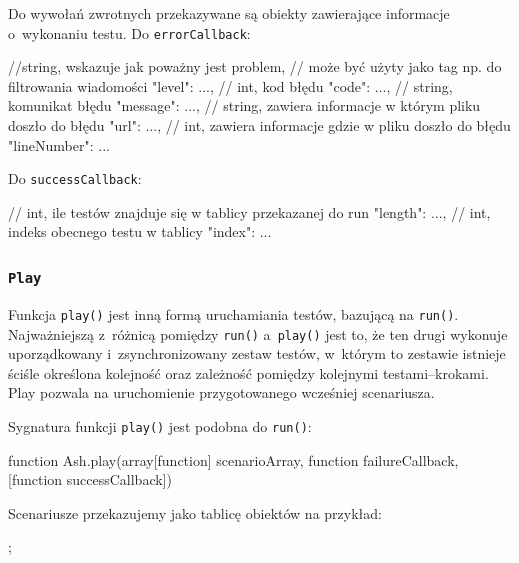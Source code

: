 \documentclass[brudnopis]{xmgr}
\begin{document}
Do wywołań zwrotnych przekazywane są obiekty zawierające informacje o~wykonaniu testu. Do \texttt{errorCallback}:

\begin{javascriptcode}
	{
    //string, wskazuje jak poważny jest problem, 
    //  może być użyty jako tag np. do filtrowania wiadomości 
		"level":  ...,
    //  int, kod błędu
		"code":   ...,
    // string, komunikat błędu
		"message":   ...,
    // string, zawiera informacje w którym pliku doszło do błędu  
		"url":   ...,
    // int, zawiera informacje gdzie w pliku doszło do błędu
		"lineNumber":  ...
	}
\end{javascriptcode}

Do \texttt{successCallback}: 

\begin{javascriptcode}
	{
    // int, ile testów znajduje się w tablicy przekazanej do run 
		"length":  ...,
    // int, indeks obecnego testu w tablicy 
		"index": ...
	}
\end{javascriptcode}

\subsubsection{\texttt{Play}} 

Funkcja \texttt{play()} jest inną formą uruchamiania testów, bazującą na \texttt{run()}. Najważniejszą z~różnicą pomiędzy \texttt{run()} a~\texttt{play()} jest to, że ten drugi wykonuje uporządkowany i~zsynchronizowany zestaw testów, w~którym to zestawie istnieje ściśle określona kolejność oraz zależność pomiędzy kolejnymi testami--krokami. Play pozwala na uruchomienie przygotowanego wcześniej scenariusza. 

Sygnatura funkcji \texttt{play()} jest podobna do \texttt{run()}:

\begin{javascriptcode}
function Ash.play(array[function] scenarioArray, 
                  function failureCallback, 
                  [function successCallback]) 
\end{javascriptcode}

Scenariusze przekazujemy jako tablicę obiektów na przykład:

\begin{javascriptcode}
;
\end{javascriptcode}
\end{document}
